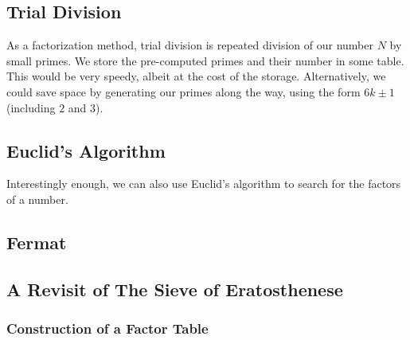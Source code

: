 \documentclass{article}
\begin{document}
\subsection{ Trial Division }
\par As a factorization method, trial division is repeated division of our number $N$ by
small primes. We store the pre-computed primes and their number in some table. This would be very
speedy, albeit at the cost of the storage. Alternatively, we could save space by generating our 
primes along the way, using the form $6k \pm 1$ (including $2$ and $3$).

\subsection{ Euclid's Algorithm }
\par Interestingly enough, we can also use Euclid's algorithm to search for the factors of a
number.


\subsection{ Fermat }

\subsection{A Revisit of The Sieve of Eratosthenese}

\subsubsection {Construction of a Factor Table}
	


\end{document}
